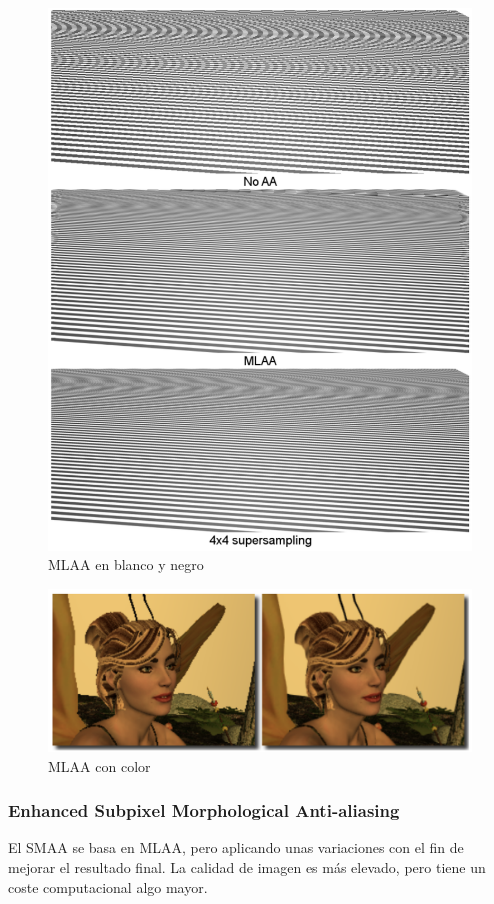 \documentclass[withindex, glossary]{cam-thesis}
\begin{document}
\begin{figure}[!htbp]
    \includegraphics[width=.8\linewidth]{figures/mlaacomparison.png}
    \caption{MLAA en blanco y negro\label{mlaacomparison}}
\end{figure}

\begin{figure}[!htbp]
    \includegraphics[width=\linewidth]{figures/mlaares.png}
    \caption{MLAA con color\label{mlaacomparison}}
\end{figure}

\subsubsection{Enhanced Subpixel Morphological Anti-aliasing}

El SMAA\cite{Jimenez:2012:SES:2318858.2318861} se basa en MLAA, pero aplicando unas variaciones con el fin de mejorar el resultado final. La calidad de imagen es más elevado, pero tiene un coste computacional algo mayor.
\end{document}

